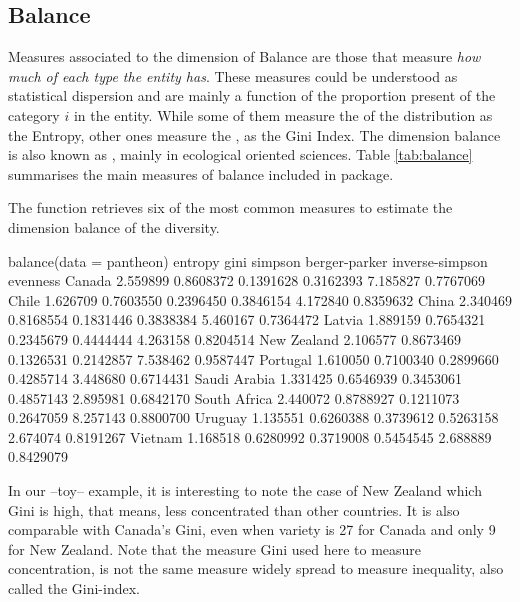\subsection{Balance}
Measures associated to the dimension of Balance are those that measure \emph{how much of each type the entity has}. These measures could be understood as statistical dispersion and are mainly a function of the proportion present of the category $i$ in the entity. While some of them measure the  of the distribution as the Entropy, other ones measure the , as the Gini Index. The dimension balance is also known as , mainly in ecological oriented sciences. Table \ref{tab:balance} summarises the main measures of balance included in  package.

The function  retrieves six of the most common measures to estimate the dimension balance of the diversity. 

\begin{example}
  balance(data = pantheon)
              entropy      gini   simpson berger-parker inverse-simpson  evenness
Canada       2.559899 0.8608372 0.1391628     0.3162393        7.185827 0.7767069
Chile        1.626709 0.7603550 0.2396450     0.3846154        4.172840 0.8359632
China        2.340469 0.8168554 0.1831446     0.3838384        5.460167 0.7364472
Latvia       1.889159 0.7654321 0.2345679     0.4444444        4.263158 0.8204514
New Zealand  2.106577 0.8673469 0.1326531     0.2142857        7.538462 0.9587447
Portugal     1.610050 0.7100340 0.2899660     0.4285714        3.448680 0.6714431
Saudi Arabia 1.331425 0.6546939 0.3453061     0.4857143        2.895981 0.6842170
South Africa 2.440072 0.8788927 0.1211073     0.2647059        8.257143 0.8800700
Uruguay      1.135551 0.6260388 0.3739612     0.5263158        2.674074 0.8191267
Vietnam      1.168518 0.6280992 0.3719008     0.5454545        2.688889 0.8429079
\end{example}

In our --toy-- example, it is interesting to note the case of New Zealand which Gini is high, that means, less concentrated than other countries. It is also comparable with Canada's Gini, even when variety is 27 for Canada and only 9 for New Zealand. Note that the measure Gini used here to measure concentration, is not the same measure widely spread to measure inequality, also called the Gini-index. 

